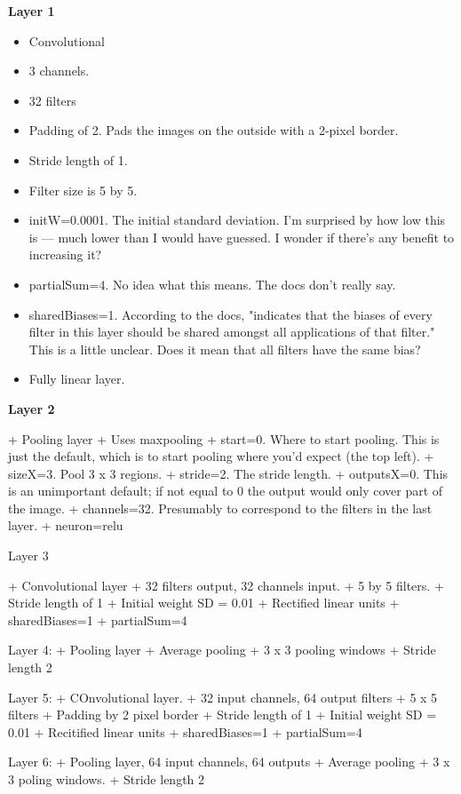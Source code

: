 \documentclass[12pt]{report}
\begin{document}
\textbf{Layer 1}
\begin{itemize}
\item Convolutional
\item 3 channels.  
\item 32 filters
\item Padding of 2.  Pads the images on the outside with a 2-pixel border.
\item Stride length of 1.
\item Filter size is 5 by 5.
\item initW=0.0001.  The initial standard deviation.  I'm surprised by how
  low this is --- much lower than I would have guessed.  I wonder if
  there's any benefit to increasing it?
\item partialSum=4.  No idea what this means.  The docs don't really say.
\item sharedBiases=1.  According to the docs, "indicates that the biases
  of every filter in this layer should be shared amongst all
  applications of that filter."  This is a little unclear.  Does it
  mean that all filters have the same bias?
\item Fully linear layer.
\end{itemize}

\textbf{Layer 2}

+ Pooling layer
+ Uses maxpooling
+ start=0.  Where to start pooling.  This is just the default, which
  is to start pooling where you'd expect (the top left).
+ sizeX=3.  Pool 3 x 3 regions.
+ stride=2.  The stride length.
+ outputsX=0.  This is an unimportant default; if not equal to 0 the
  output would only cover part of the image.
+ channels=32.  Presumably to correspond to the filters in the last
  layer.
+ neuron=relu

Layer 3

+ Convolutional layer
+ 32 filters output, 32 channels input.
+ 5 by 5 filters.
+ Stride length of 1
+ Initial weight SD = 0.01
+ Rectified linear units
+ sharedBiases=1
+ partialSum=4

Layer 4:
+ Pooling layer
+ Average pooling
+ 3 x 3 pooling windows
+ Stride length 2

Layer 5:
+ COnvolutional layer.
+ 32 input channels, 64 output filters
+ 5 x 5 filters
+ Padding by 2 pixel border
+ Stride length of 1
+ Initial weight SD = 0.01
+ Recitified linear units
+ sharedBiases=1
+ partialSum=4

Layer 6:
+ Pooling layer, 64 input channels, 64 outputs
+ Average pooling
+ 3 x 3 poling windows.
+ Stride length 2
\end{document}
